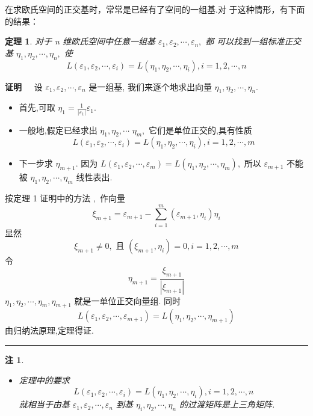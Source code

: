 \documentclass[13pt]{beamer}
\newtheorem{thm}{定理}
\newtheorem*{rem}{注}
\def\qed{\nopagebreak\hfill{\rule{4pt}{7pt}}\medbreak}
\def\pf{{\bf 证明~~ }}
\begin{document}
\begin{frame}
在求欧氏空间的正交基时，常常是已经有了空间的一组基.对 于这种情形，有下面的结果：

\begin{thm}
对于 n 维欧氏空间中任意一组基 ${\varepsilon}_{1}, {\varepsilon}_{2}, \cdots, {\varepsilon}_{n},$ 都
可以找到一组标准正交基 ${\eta}_{1}, {\eta}_{2}, \cdots, {\eta}_{n},$ 使
\[
L\left(\varepsilon_{1}, \varepsilon_{2}, \cdots, \varepsilon_{i}\right)=L\left(\eta_{1}, \eta_{2}, \cdots, \eta_{i}\right), i=1,2, \cdots, n
\]
\end{thm}
\pf 
 设 ${\varepsilon}_{1}, {\varepsilon}_{2}, \cdots, {\varepsilon}_{n}$ 是一组基, 我们来逐个地求出向量
${\eta}_{1}, {\eta}_{2}, \cdots, {\eta}_{n}$.

\begin{itemize}
	\item 首先,可取 ${\eta}_{1}=\frac{1}{\left|{\varepsilon}_{1}\right|} {\varepsilon}_{1} .$ 
	
	\item 一般地,假定已经求出 ${\eta}_{1}, {\eta}_{2}, \cdots$
	${\eta}_{m},$ 它们是单位正交的,具有性质
	\[
	L\left({\varepsilon}_{1}, {\varepsilon}_{2}, \cdots, {\varepsilon}_{i}\right)=L\left({\eta}_{1}, {\eta}_{2}, \cdots, {\eta}_{i}\right), i=1,2, \cdots, m
	\]
	
	\item 下一步求 ${\eta}_{m+1}$. 
	因为 $L\left({\varepsilon}_{1}, {\varepsilon}_{2}, \cdots, {\varepsilon}_{m}\right)=L\left({\eta}_{1}, {\eta}_{2}, \cdots, {\eta}_{m}\right),$ 所以 ${\varepsilon}_{m+1}$ 不能
	被 ${\eta}_{1}, {\eta}_{2}, \cdots, {\eta}_{m}$ 线性表出.
\end{itemize}
\end{frame}


\begin{frame}	
	按定理 1 证明中的方法 $,$ 作向量
	\[
	\xi_{m+1}=\varepsilon_{m+1}-\sum_{i=1}^{m}\left(\varepsilon_{m+1}, \eta_{i}\right) \eta_{i}
	\]
	显然
	\[
	\xi_{m+1} \neq 0, \text { 且 }\left(\xi_{m+1}, \eta_{i}\right)=0, i=1,2, \cdots, m
	\]
	令
	\[
	{\eta}_{m+1}=\frac{{\xi}_{m+1}}{\left|{\xi}_{m+1}\right|}
	\]
	${\eta}_{1}, {\eta}_{2}, \cdots, {\eta}_{m}, {\eta}_{m+1}$ 就是一单位正交向量组.
	同时
	\[
	L\left({\varepsilon}_{1}, {\varepsilon}_{2}, \cdots, {\varepsilon}_{m+1}\right)=L\left({\eta}_{1}, {\eta}_{2}, \cdots, {\eta}_{m+1}\right)
	\]
	由归纳法原理,定理得证.  
\qed

\end{frame}

\begin{frame}
\begin{rem}
\begin{itemize}
	\item 定理中的要求
	\[
	L\left(\varepsilon_{1}, \varepsilon_{2}, \cdots, \varepsilon_{i}\right)=L\left(\eta_{1}, \eta_{2}, \cdots, \eta_{i}\right), i=1,2, \cdots, n
	\]
	就相当于由基 ${\varepsilon}_{1}, {\varepsilon}_{2}, \cdots, {\varepsilon}_{n}$ 到基 ${\eta}_{i}, {\eta}_{2}, \cdots, {\eta}_{n}$ 的过渡矩阵是上三角矩阵.
\end{itemize}
\end{rem}
\end{frame}
\end{document}
